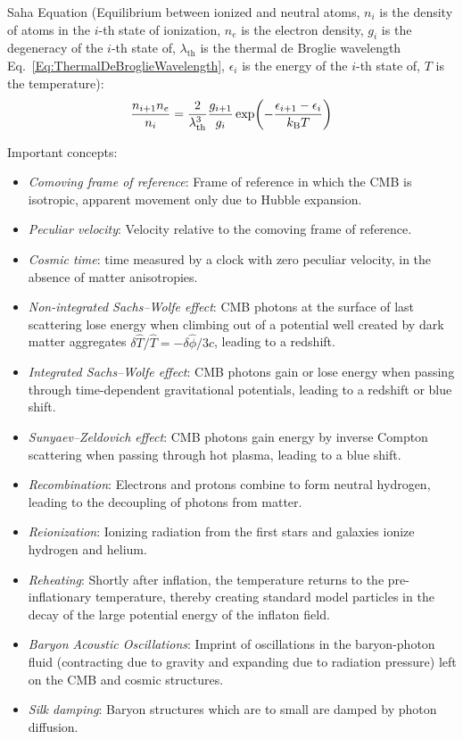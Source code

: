 		\noindent
		Saha Equation (Equilibrium between ionized and neutral atoms, $n_i$ is the density of atoms in the $i$-th state of ionization, $n_e$ is the electron density, $g_i$ is the degeneracy of the $i$-th state of, $\lambda_\text{th}$ is the thermal de Broglie wavelength Eq.~\ref{Eq:ThermalDeBroglieWavelength}, $\epsilon_i$ is the energy of the $i$-th state of, $T$ is the temperature):
		\begin{equation}
			\frac{n_{i+1} n_e}{n_i} = \frac{2}{\lambda_\text{th}^3} \frac{g_{i+1}}{g_i} \exp(- \frac{\epsilon_{i+1}-\epsilon_{i}}{k_{\text{B}} T})
		\end{equation}


		\noindent
		Important concepts:
		\begin{itemize}
			\item \emph{Comoving frame of reference}: Frame of reference in which the CMB is isotropic, apparent movement only due to Hubble expansion.
			\item \emph{Peculiar velocity}: Velocity relative to the comoving frame of reference.
			\item \emph{Cosmic time}: time measured by a clock with zero peculiar velocity, in the absence of matter anisotropies.
			\item \emph{Non-integrated Sachs--Wolfe effect}: CMB photons at the surface of last scattering lose energy when climbing out of a potential well created by dark matter aggregates $\delta \hat{T} / \hat{T} = -\delta \hat{\phi} / 3c$, leading to a redshift.
			\item \emph{Integrated Sachs--Wolfe effect}: CMB photons gain or lose energy when passing through time-dependent gravitational potentials, leading to a redshift or blue shift.
			\item \emph{Sunyaev--Zeldovich effect}: CMB photons gain energy by inverse Compton scattering when passing through hot plasma, leading to a blue shift.
			\item \emph{Recombination}: Electrons and protons combine to form neutral hydrogen, leading to the decoupling of photons from matter.
			\item \emph{Reionization}: Ionizing radiation from the first stars and galaxies ionize hydrogen and helium.
			\item \emph{Reheating}: Shortly after inflation, the temperature returns to the pre-inflationary temperature, thereby creating standard model particles in the decay of the large potential energy of the inflaton field.
			\item \emph{Baryon Acoustic Oscillations}: Imprint of oscillations in the baryon-photon fluid (contracting due to gravity and expanding due to radiation pressure) left on the CMB and cosmic structures.
			\item \emph{Silk damping}: Baryon structures which are to small are damped by photon diffusion.
		\end{itemize}

